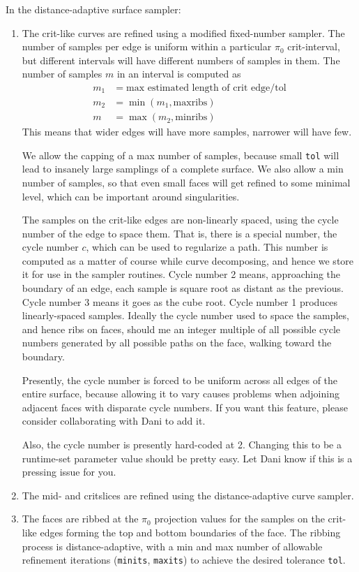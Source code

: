 In the distance-adaptive surface sampler:
\begin{enumerate}
\item The crit-like curves are refined using a modified fixed-number sampler.  The number of samples per edge is uniform within a particular $\pi_0$ crit-interval, but different intervals will have different numbers of samples in them.  The number of samples $m$ in an interval is computed as
\begin{align*}
m_1 &= \text{max estimated length of crit edge} / \text{tol} \\
m_2 &= \min(m_1, \text{maxribs}) \\
m &= \max(m_2, \text{minribs})
\end{align*}
This means that wider edges will have more samples, narrower will have few.

We allow the capping of a max number of samples, because small {\tt tol} will lead to insanely large samplings of a complete surface.  We also allow a min number of samples, so that even small faces will get refined to some minimal level, which can be important around singularities.

The samples on the crit-like edges are non-linearly spaced, using the cycle number of the edge to space them.  That is, there is a special number, the cycle number $c$, which can be used to regularize a path.  This number is computed as a matter of course while curve decomposing, and hence we store it for use in the sampler routines.  Cycle number 2 means, approaching the boundary of an edge, each sample is square root as distant as the previous.  Cycle number 3 means it goes as the cube root.  Cycle number 1 produces linearly-spaced samples.  Ideally the cycle number used to space the samples, and hence ribs on faces, should me an integer multiple of all possible cycle numbers generated by all possible paths on the face, walking toward the boundary.

Presently, the cycle number is forced to be uniform across all edges of the entire surface, because allowing it to vary causes problems when adjoining adjacent faces with disparate cycle numbers.  If you want this feature, please consider collaborating with Dani to add it.

Also, the cycle number is presently hard-coded at 2.  Changing this to be a runtime-set parameter value should be pretty easy.  Let Dani know if this is a pressing issue for you.



\item  The mid- and critslices are refined using the distance-adaptive curve sampler.

\item The faces are ribbed at the $\pi_0$ projection values for the samples on the crit-like edges forming the top and bottom boundaries of the face.  The ribbing process is distance-adaptive, with a min and max number of allowable refinement iterations ({\tt minits}, {\tt maxits}) to achieve the desired tolerance {\tt tol}.
\end{enumerate}




